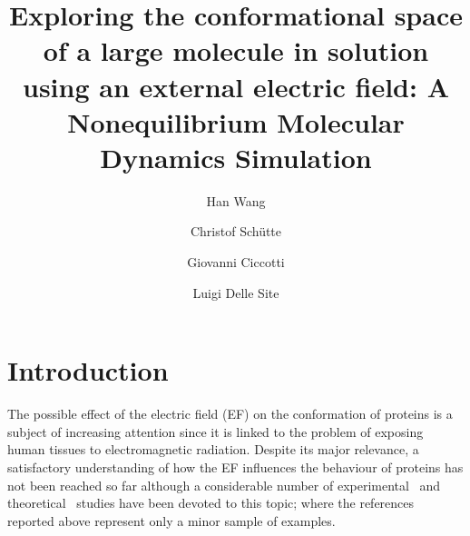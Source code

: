 \documentclass[a4paper,preprint,unsortedaddress,onecolumn]{revtex4-1}
\begin{document}
\title{Exploring the conformational space of a large molecule in solution using an external electric field: A Nonequilibrium Molecular Dynamics Simulation}
\author{Han Wang}
\author{Christof Sch\"utte}
\author{Giovanni Ciccotti}
\author{Luigi Delle Site}

\begin{abstract}
\end{abstract}

\maketitle


\section{Introduction}


The possible effect of the electric field (EF) on the conformation of
proteins is a subject of increasing attention since it is linked to the problem of exposing human tissues to
electromagnetic radiation. Despite its major relevance, a
satisfactory understanding of how the EF influences the behaviour of proteins
has not been reached so far although a considerable number of
experimental~\cite{bohr2000microwave, bohr2000microwave-1,
  dePomerai2000cell, inskip2001cellular, mancinelli2004non} and
theoretical~\cite{budi2005electric, budi2007effect,
  budi2008comparative, toschi2008effects, astrakas2011electric,
  astrakas2012structural, damm2012can, starzyk2013proteins,
  english2009nonequilibrium, solomentsev2012effects} studies have been devoted to this topic;
where the references reported above represent only a minor sample of examples.
\end{document}
